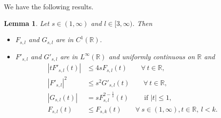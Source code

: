 \documentclass[11pt, a4paper]{article}
\newtheorem{lemma}[theorem]{Lemma}
\numberwithin{equation}{section}
\newcommand{\RR}{{\mathbb R}}
\newcommand{\abs}[1]{\left\lvert #1\right\rvert}
\begin{document}
We have the following results.
\begin{lemma}
  Let $s \in (1,\infty)$ and $l \in [3,\infty)$. Then
  \begin{itemize}
  \item[$(i)$]  $F_{s,l}$ and $G_{s,l}$ are in $C^{1}(\RR)$.
  \item[$(ii)$] $F'_{s,l}$ and $G'_{s,l}$ are in $L^{\infty}(\RR)$ and
  uniformly continuous on $\RR$ and
  \begin{align}
\abs{tF'_{s,l}(t)}
    &\le 4sF_{s,l}(t)\qquad \forall~t\in\RR,
  \label{ss1}\\
  \abs{F'_{s,l}}^{2}
  &\le s^{2}G'_{s,l}(t)\qquad \forall~t\in \RR,
  \label{ss2}\\
  \abs{G_{s,l}(t)}
  &= sF_{s,l}
^{2-\frac{1}{s}}(t)
\qquad ~\text{if }|t|\le 1,
\label{ss3}\\
F_{s,l}(t)
&\le F_{s,k}(t)
\qquad \forall~s\in(1,\infty), t\in\RR,~ l<k.
\label{ss4}
\end{align}
\end{itemize}

\label{lem62}
\end{lemma}
\end{document}
